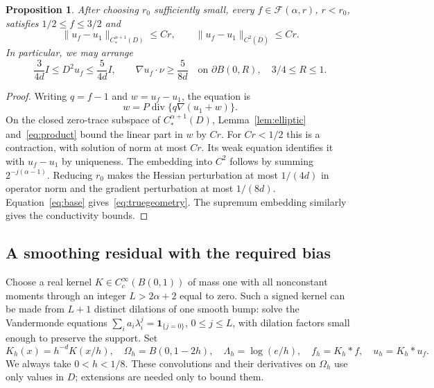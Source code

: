 \documentclass[11pt]{article}
\newtheorem{proposition}[theorem]{Proposition}
\theoremstyle{remark}
\newcommand{\cF}{\mathcal F}
\newcommand{\diver}{\operatorname{div}}
\newcommand{\norm}[1]{\lVert #1\rVert}
\begin{document}
\begin{proposition}\label{prop:geometry}
After choosing $r_0$ sufficiently small, every $f\in\cF(\alpha,r)$, $r<r_0$, satisfies $1/2\le f\le3/2$ and
\begin{equation}\label{eq:regular}
 \norm{u_f-u_1}_{C_*^{\alpha+1}(D)}\le Cr,
 \qquad \norm{u_f-u_1}_{C^2(\overline D)}\le Cr.
\end{equation}
In particular, we may arrange
\begin{equation}\label{eq:truegeometry}
 \frac{3}{4d}I\le D^2u_f\le\frac{5}{4d}I,
 \qquad \nabla u_f\cdot\nu\ge\frac{5}{8d}
 \quad\text{on }\partial B(0,R),\quad 3/4\le R\le1.
\end{equation}
\end{proposition}
\begin{proof}
Writing $q=f-1$ and $w=u_f-u_1$, the equation is
\begin{equation}\label{eq:fixedpoint}
 w=P\diver\{q\nabla(u_1+w)\}.
\end{equation}
On the closed zero-trace subspace of $C_*^{\alpha+1}(D)$, Lemma~\ref{lem:elliptic} and~\eqref{eq:product} bound the linear part in $w$ by $Cr$. For $Cr<1/2$ this is a contraction, with solution of norm at most $Cr$. Its weak equation identifies it with $u_f-u_1$ by uniqueness. The embedding into $C^2$ follows by summing $2^{-j(\alpha-1)}$. Reducing $r_0$ makes the Hessian perturbation at most $1/(4d)$ in operator norm and the gradient perturbation at most $1/(8d)$. Equation~\eqref{eq:base} gives~\eqref{eq:truegeometry}. The supremum embedding similarly gives the conductivity bounds.
\end{proof}

\subsection{A smoothing residual with the required bias}
Choose a real kernel $K\in C_c^\infty(B(0,1))$ of mass one with all nonconstant moments through an integer $L>2\alpha+2$ equal to zero. Such a signed kernel can be made from $L+1$ distinct dilations of one smooth bump: solve the Vandermonde equations $\sum_i a_i\lambda_i^j=\mathbf1_{\{j=0\}}$, $0\le j\le L$, with dilation factors small enough to preserve the support. Set
\[
 K_h(x)=h^{-d}K(x/h),\quad
 \Omega_h=B(0,1-2h),\quad \Lambda_h=\log(e/h),
 \quad f_h=K_h*f,\quad u_h=K_h*u_f.
\]
We always take $0<h<1/8$. These convolutions and their derivatives on $\Omega_h$ use only values in $D$; extensions are needed only to bound them.
\end{document}
